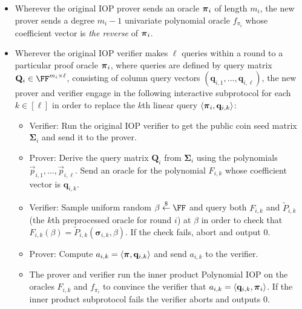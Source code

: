 \begin{itemize}

\item Wherever the original IOP prover sends an oracle $\boldsymbol{\pi}_i$ of length $m_i$, the new prover sends a degree $m_i - 1$ univariate polynomial oracle $f_{\pi_i}$ whose coefficient vector is \emph{the reverse} of $\boldsymbol{\pi}_i$. 

\item Wherever the original IOP verifier makes $\ell$ queries within a round to a particular proof oracle $\boldsymbol{\pi}_i$, where queries are defined by query matrix $\mathbf{Q}_i \in \FF^{m_i \times \ell}$, consisting of column query vectors $(\mathbf{q}_{i,1},...,\mathbf{q}_{i,\ell})$, the new prover and verifier engage in the following interactive subprotocol for each $k \in [\ell]$ in order to replace the $k$th linear query $\langle \boldsymbol{\pi}_i, \mathbf{q}_{i,k} \rangle$: 

\begin{itemize}[nolistsep]
\item Verifier: Run the original IOP verifier to get the public coin seed matrix $\boldsymbol{\Sigma}_i$ and send it to the prover.
 \item Prover: Derive the query matrix $\mathbf{Q}_i$ from $\boldsymbol{\Sigma}_i$ using the polynomials $\vec{p}_{i,1}, \ldots, \vec{p}_{i, \ell}$. Send an oracle for the polynomial $F_{i,k}$ whose coefficient vector is $\mathbf{q}_{i,k}$. 
 \item Verifier: Sample uniform random $\beta \sample \FF$ and query both $F_{i,k}$ and $\tilde{P}_{i,k}$ (the $k$th preprocessed oracle for round $i$) at $\beta$ in order to check that $F_{i,k} (\beta) = \tilde{P}_{i,k}(\boldsymbol{\sigma}_{i,k}, \beta)$. If the check fails, abort and output 0.
 
 
 \item Prover: Compute $a_{i,k} = \langle \boldsymbol{\pi}, \mathbf{q}_{i,k} \rangle$ and send $a_{i,k}$ to the verifier. 
 
 \item The prover and verifier run the inner product Polynomial IOP on the oracles $F_{i,k}$ and $f_{\pi_i}$ to convince the verifier that $a_{i,k} = \langle \mathbf{q}_{i,k}, \boldsymbol{\pi}_i \rangle$. If the inner product subprotocol fails the verifier aborts and outputs 0.  
 \end{itemize}
 
\end{itemize}

